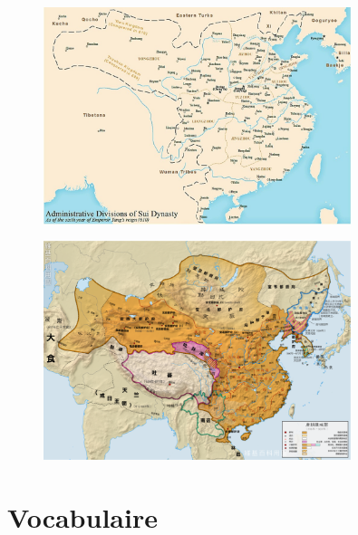 \begin{figure}[!h]
    \centering
    \includegraphics[width=0.8\textwidth]{ConfucianismeTaoismeBouddhismeChinois/Images/Sui.jpg}
 
    \label{fig:enter-label}
\end{figure} 



\begin{figure}[!h]
    \centering
    \includegraphics[width=0.8\textwidth]{ConfucianismeTaoismeBouddhismeChinois/Images/Tang.png}
 
    \label{fig:enter-label}
\end{figure} 




\section{Vocabulaire}

